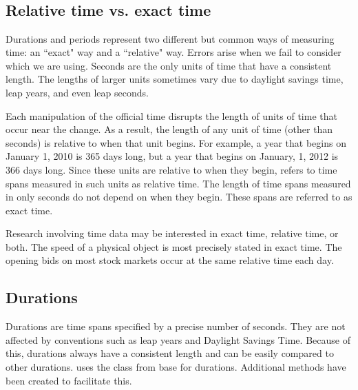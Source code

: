 \documentclass[article]{jss}
\begin{document}
\\
\\
\\
\\


\subsection{Relative time vs. exact time}

Durations and periods represent two different but common ways of measuring time: an ``exact" way and a ``relative" way.  Errors arise when we fail to consider which we are using.  Seconds are the only units of time that have a consistent length. The lengths of larger units sometimes vary due to daylight savings time, leap years, and even leap seconds. 


Each manipulation of the official time disrupts the length of units of time that occur near the change. As a result, the length of any unit of time (other than seconds) is relative to when that unit begins. For example, a year that begins on January 1, 2010 is 365 days long, but a year that begins on January, 1, 2012 is 366 days long. Since these units are relative to when they begin,  refers to time spans measured in such units as relative time. The length of time spans measured in only seconds do not depend on when they begin. These spans are referred to as exact time.

Research involving time data may be interested in exact time, relative time, or both. The speed of a physical object is most precisely stated in exact time. The opening bids on most stock markets occur at the same relative time each day.  

\subsection{Durations}
\label{sec:durations}
Durations are time spans specified by a precise number of seconds. They are not affected by conventions such as leap years and Daylight Savings Time. Because of this, durations always have a consistent length and can be easily compared to other durations.  uses the  class from base  for durations. Additional  methods have been created to facilitate this. 
\end{document}
